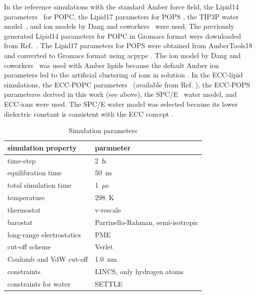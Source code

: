 \documentclass[journal=jpcbfk,manuscript=article]{achemso}
\begin{document}
In the reference simulations with the standard Amber force field,
the Lipid14 parameters~\cite{dickson14} for POPC, the Lipid17 parameters for POPS \cite{lipid17-future},
the TIP3P water model~\cite{jorgensen83}, and ion models by Dang and coworkers~\cite{smith94,chang1999,dang2006} were used.
The previously generated \cite{botan15} Lipid14 parameters for POPC in Gromacs format were downloaded from Ref.~. 
The Lipid17 parameters for POPS were obtained from AmberTools18 \cite{amber18} 
and converted to Gromacs format using acpype \cite{acpype}.  
The ion model by Dang and coworkers~\cite{smith94,chang1999,dang2006} was used with Amber lipids because
the default Amber ion parameters \cite{aqvist90} led to the artificial clustering of ions in solution \cite{NMRlipidsIV}.
In the ECC-lipid simulations,
the ECC-POPC parameters~\cite{melcr18} (available from Ref. ), 
the ECC-POPS parameteres derived in this work (see above), 
the SPC/E~\cite{Berendsen1987} water model, and ECC-ions \cite{martinek17, kohagen16, Pluharova2014} were used.
The SPC/E water model was selected because its lower dielectric constant is consistent with the
ECC concept \cite{leontyev11,leontyev14}.
\begin{table}[tbp]
  \caption{Simulation parameters}
  \label{tbl:mdpar}
  \begin{tabular}{ll}
    simulation property & parameter   \\
    \hline
    time-step           & 2~fs         \\
    equilibration time  & 50~ns  \\
    total simulation time     & 1~$\mu$s  \\
    temperature         & 298~K       \\
    thermostat          & v-rescale  \cite{bussi07}   \\
    barostat            & Parrinello-Rahman, semi-isotropic \cite{parrinello81} \\
    long-range electrostatics & PME  \cite{darden93}  \\
    cut-off scheme      & Verlet \cite{Pall13}      \\
    Coulomb and VdW cut-off & 1.0~nm \\
    constraints         & LINCS, only hydrogen atoms \cite{hess97} \\
    constraints for water & SETTLE  \cite{miyamoto92} \\
    \hline
  \end{tabular}
\end{table}
 
\end{document}
